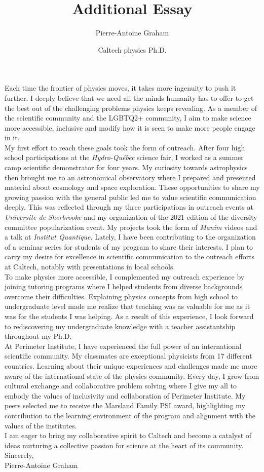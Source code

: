 \documentclass[12pt]{article}
\title{Additional Essay}
\author{Pierre-Antoine Graham}
\date{Caltech physics Ph.D.}
\begin{document}
\maketitle
\vspace{0.5cm}

Each time the frontier of physics moves, it takes more ingenuity to push it further. I deeply believe that we need all the minds humanity has to offer to get the best out of the challenging problems physics keeps revealing. As a member of the scientific community and the LGBTQ2+ community, I aim to make science more accessible, inclusive and modify how it is seen to make more people engage in it.\\[0.3cm]

My first effort to reach these goals took the form of outreach. After four high school participations at the \textit{Hydro-Québec} science fair, I worked as a summer camp scientific demonstrator for four years. My curiosity towards astrophysics then brought me to an astronomical observatory where I prepared and presented material about cosmology and space exploration. These opportunities to share my growing passion with the general public led me to value scientific communication deeply. This was reflected through my three participations in outreach events at \textit{Universite de Sherbrooke} and my organization of the 2021 edition of the diversity committee popularization event. My projects took the form of \textit{Manim} videos and a talk at \textit{Institut Quantique}. Lately, I have been contributing to the organization of a seminar series for students of my program to share their interests. I plan to carry my desire for excellence in scientific communication to the outreach efforts at Caltech, notably with presentations in local schools.\\[0.3cm]

To make physics more accessible, I complemented my outreach experience by joining tutoring programs where I helped students from diverse backgrounds overcome their difficulties. Explaining physics concepts from high school to undergraduate level made me realize that teaching was as valuable for me as it was for the students I was helping. As a result of this experience, I look forward to rediscovering my undergraduate knowledge with a teacher assistantship throughout my Ph.D.\\[0.3cm]

At Perimeter Institute, I have experienced the full power of an international scientific community. My classmates are exceptional physicists from 17 different countries. Learning about their unique experiences and challenges made me more aware of the international state of the physics community. Every day, I grow from cultural exchange and collaborative problem solving where I give my all to embody the values of inclusivity and collaboration of Perimeter Institute. My peers selected me to receive the Marsland Family PSI award, highlighting my contribution to the learning environment of the program and alignment with the values of the institutes.\\[0.3cm]

I am eager to bring my collaborative spirit to Caltech and become a catalyst of ideas nurturing a collective passion for science at the heart of its community. \\[0.3cm]

Sincerely, \\

Pierre-Antoine Graham
\end{document}
